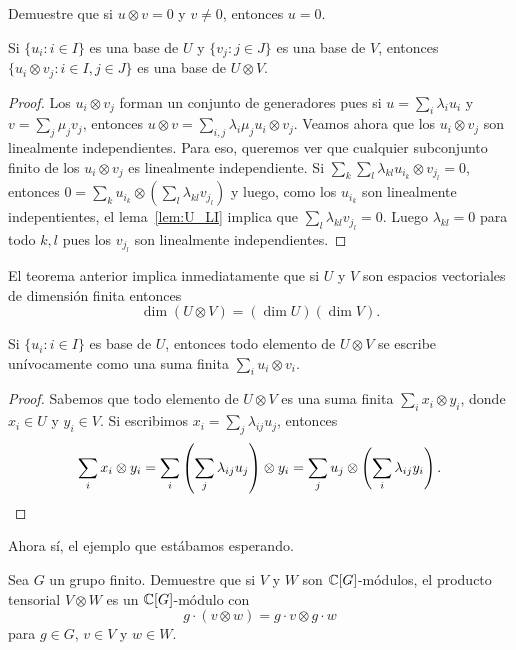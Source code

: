 \begin{exercise}
	\label{xca:uxv=0}
	Demuestre que si $u\otimes v=0$ y $v\ne 0$, entonces $u=0$.
\end{exercise}

\begin{theorem}
	Si $\{u_i:i\in I\}$ es una base de $U$ y $\{v_j:j\in J\}$ es una base de
	$V$, entonces $\{u_i\otimes v_j:i\in I,j\in J\}$ es una base de $U\otimes
	V$.
\end{theorem}

\begin{proof}
	Los $u_i\otimes v_j$ forman un conjunto de generadores pues  
	si $u=\sum_i\lambda_iu_i$ y $v=\sum_j\mu_jv_j$, entonces
	$u\otimes v=\sum_{i,j}\lambda_i\mu_ju_i\otimes v_j$. 
	Veamos ahora que los $u_i\otimes v_j$ son linealmente independientes. Para
	eso, queremos ver que cualquier subconjunto finito de los $u_i\otimes v_j$
	es linealmente independiente. Si $\sum_k\sum_l\lambda_{kl}u_{i_k}\otimes
	v_{j_l}=0$, entonces
	$0=\sum_{k}u_{i_k}\otimes\left(\sum_{l}\lambda_{kl}v_{j_l}\right)$ y luego,
	como los $u_{i_k}$ son linealmente indepentientes, el lema~\ref{lem:U_LI}
	implica que $\sum_{l}\lambda_{kl}v_{j_l}=0$. Luego $\lambda_{kl}=0$ para
	todo $k,l$ pues los $v_{j_l}$ son linealmente independientes.
\end{proof}

El teorema anterior implica inmediatamente que si $U$ y $V$ son espacios
vectoriales de dimensión finita entonces
\[
	\dim(U\otimes V)=(\dim U)(\dim V).
\]

\begin{corollary}
	Si $\{u_i:i\in I\}$ es base de $U$, entonces todo elemento de $U\otimes V$
	se escribe unívocamente como una suma finita $\sum_{i}u_i\otimes v_i$.
\end{corollary}

\begin{proof}
	Sabemos que todo elemento de $U\otimes V$ es una suma finita
	$\sum_i x_i\otimes y_i$, donde $x_i\in U$ y $y_i\in V$. Si escribimos 
	$x_i=\sum_j\lambda_{ij}u_j$, entonces
	\[
		\sum_i x_i\otimes y_i=\sum_i\left(\sum_j\lambda_{ij}u_j\right)\otimes y_i		
		=\sum_j u_j\otimes\left(\sum_i\lambda_{ij}y_i\right).\qedhere
	\]
\end{proof}

Ahora sí, el ejemplo que estábamos esperando. 

\begin{exercise}
	Sea $G$ un grupo finito. Demuestre que si $V$ y $W$ son $\mathbb{C}[G]$-módulos, el producto
	tensorial $V\otimes W$ es un $\mathbb{C}[G]$-módulo con 
	\[
	g\cdot (v\otimes w)=g\cdot v\otimes
	g\cdot w
	\]
	para $g\in G$, $v\in V$ y $w\in W$.
\end{exercise}

